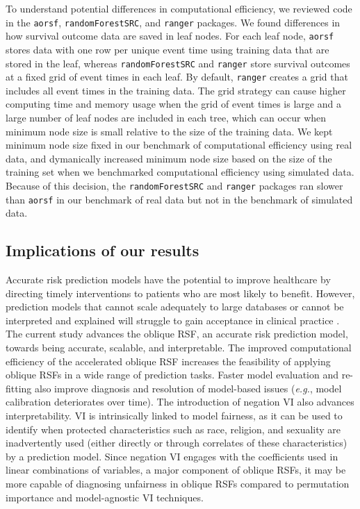 \documentclass[12pt]{article}\usepackage[]{graphicx}\usepackage[]{xcolor}
\newcommand{\eg}{\textit{e.g.}}
\begin{document}
To understand potential differences in computational efficiency, we reviewed code in the \texttt{aorsf}, \texttt{randomForestSRC}, and \texttt{ranger} packages. We found differences in how survival outcome data are saved in leaf nodes. For each leaf node, \texttt{aorsf} stores data with one row per unique event time using training data that are stored in the leaf, whereas \texttt{randomForestSRC} and \texttt{ranger} store survival outcomes at a fixed grid of event times in each leaf. By default, \texttt{ranger} creates a grid that includes all event times in the training data. The grid strategy can cause higher computing time and memory usage when the grid of event times is large and a large number of leaf nodes are included in each tree, which can occur when minimum node size is small relative to the size of the training data. We kept minimum node size fixed in our benchmark of computational efficiency using real data, and dymanically increased minimum node size based on the size of the training set when we benchmarked computational efficiency using simulated data. Because of this decision, the \texttt{randomForestSRC} and \texttt{ranger} packages ran slower than \texttt{aorsf} in our benchmark of real data but not in the benchmark of simulated data.

\subsection{Implications of our results}

Accurate risk prediction models have the potential to improve healthcare by directing timely interventions to patients who are most likely to benefit. However, prediction models that cannot scale adequately to large databases or cannot be interpreted and explained will struggle to gain acceptance in clinical practice \citep{moss2022demystifying}. The current study advances the oblique RSF, an accurate risk prediction model, towards being accurate, scalable, and interpretable. The improved computational efficiency of the accelerated oblique RSF increases the feasibility of applying oblique RSFs in a wide range of prediction tasks. Faster model evaluation and re-fitting also improve diagnosis and resolution of model-based issues (\eg, model calibration deteriorates over time). The introduction of negation VI also advances interpretability. VI is intrinsically linked to model fairness, as it can be used to identify when protected characteristics such as race, religion, and sexuality are inadvertently used (either directly or through correlates of these characteristics) by a prediction model. Since negation VI engages with the coefficients used in linear combinations of variables, a major component of oblique RSFs, it may be more capable of diagnosing unfairness in oblique RSFs compared to permutation importance and model-agnostic VI techniques.
\end{document}
